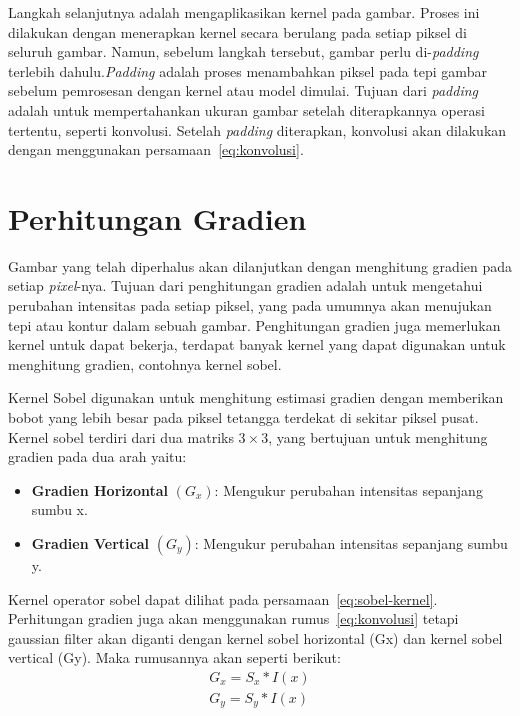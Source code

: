     Langkah selanjutnya adalah mengaplikasikan kernel pada gambar. Proses ini dilakukan dengan menerapkan kernel secara berulang pada setiap piksel di seluruh gambar.
Namun, sebelum langkah tersebut, gambar perlu di-\emph{padding} terlebih dahulu.\emph{Padding} adalah proses menambahkan piksel pada tepi gambar sebelum pemrosesan dengan kernel atau model dimulai.
Tujuan dari \emph{padding} adalah untuk mempertahankan ukuran gambar setelah diterapkannya operasi tertentu, seperti konvolusi. 
Setelah \emph{padding} diterapkan, konvolusi akan dilakukan dengan menggunakan persamaan~\eqref{eq:konvolusi}. 

\section{Perhitungan Gradien}
    Gambar yang telah diperhalus akan dilanjutkan dengan menghitung gradien pada setiap \emph{pixel}-nya. Tujuan dari penghitungan gradien adalah untuk mengetahui perubahan intensitas pada setiap piksel, yang pada umumnya akan menujukan tepi atau kontur dalam sebuah gambar.
Penghitungan gradien juga memerlukan kernel untuk dapat bekerja, terdapat banyak kernel yang dapat digunakan untuk menghitung gradien, contohnya kernel sobel. 

    Kernel Sobel digunakan untuk menghitung estimasi gradien dengan memberikan bobot yang lebih besar pada piksel tetangga terdekat di sekitar piksel pusat.
Kernel sobel terdiri dari dua matriks \(3 \times 3\), yang bertujuan untuk menghitung gradien pada dua arah yaitu:
 \begin{itemize}
    \item \textbf{Gradien Horizontal} \((G_{x})\): Mengukur perubahan intensitas sepanjang sumbu x.
    \item \textbf{Gradien Vertical} \((G_{y})\): Mengukur perubahan intensitas sepanjang sumbu y.
\end{itemize}Kernel operator sobel dapat dilihat pada persamaan~\eqref{eq:sobel-kernel}. 
Perhitungan gradien juga akan menggunakan rumus~\eqref{eq:konvolusi} tetapi gaussian filter akan diganti dengan kernel sobel horizontal (Gx) dan kernel sobel vertical (Gy).
Maka rumusannya akan seperti berikut:
\begin{equation}
    \begin{aligned}
        G_{x} = S_{x} * I(x)\\ G_{y} = S_{y} * I(x)
    \end{aligned}
\end{equation}



